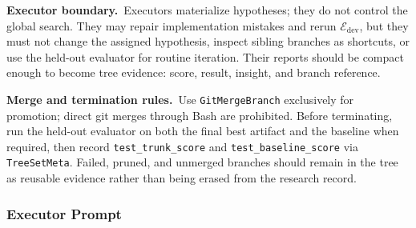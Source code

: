 \documentclass{llmxive}
\providecommand{\Eval}{\mathcal{E}}
\providecommand{\dev}{\mathrm{dev}}
\begin{document}
\begin{promptbox}[title=\textbf{Coordinator Prompt}]
\smallskip
\noindent\textbf{Executor boundary.}~Executors materialize hypotheses; they do
not control the global search. They may repair implementation mistakes and rerun
$\Eval_\dev$, but they must not change the assigned hypothesis, inspect sibling
branches as shortcuts, or use the held-out evaluator for routine iteration.
Their reports should be compact enough to become tree evidence: score, result,
insight, and branch reference.

\smallskip
\noindent\textbf{Merge and termination rules.}~Use \texttt{GitMergeBranch}
exclusively for promotion; direct git merges through Bash are prohibited. Before
terminating, run the held-out evaluator on both the final best artifact and the
baseline when required, then record \texttt{test\_trunk\_score} and
\texttt{test\_baseline\_score} via \texttt{TreeSetMeta}. Failed, pruned, and
unmerged branches should remain in the tree as reusable evidence rather than
being erased from the research record.
\end{promptbox}

\subsubsection{Executor Prompt}
\label{app:sub-agent-prompt}
\end{document}
